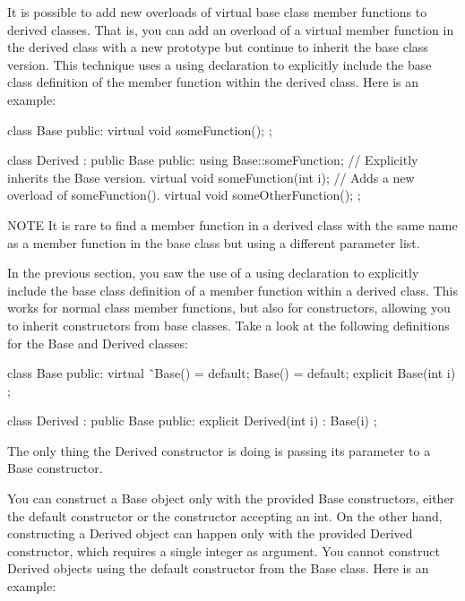 
It is possible to add new overloads of virtual base class member functions to derived classes. That is, you can add an overload of a virtual member function in the derived class with a new prototype but continue to inherit the base class version. This technique uses a using declaration to explicitly include the base class definition of the member function within the derived class. Here is an example:

\begin{cpp}
class Base
{
    public:
        virtual void someFunction();
};

class Derived : public Base
{
    public:
        using Base::someFunction; // Explicitly inherits the Base version.
        virtual void someFunction(int i); // Adds a new overload of someFunction().
        virtual void someOtherFunction();
};
\end{cpp}

\begin{myNotic}{NOTE}
It is rare to find a member function in a derived class with the same name as a member function in the base class but using a different parameter list.
\end{myNotic}


In the previous section, you saw the use of a using declaration to explicitly include the base class definition of a member function within a derived class. This works for normal class member functions, but also for constructors, allowing you to inherit constructors from base classes. Take a look at the following definitions for the Base and Derived classes:

\begin{cpp}
class Base
{
    public:
        virtual ˜Base() = default;
        Base() = default;
        explicit Base(int i) {}
};

class Derived : public Base
{
    public:
        explicit Derived(int i) : Base(i) {}
};
\end{cpp}

The only thing the Derived constructor is doing is passing its parameter to a Base constructor.

You can construct a Base object only with the provided Base constructors, either the default constructor or the constructor accepting an int. On the other hand, constructing a Derived object can happen only with the provided Derived constructor, which requires a single integer as argument. You cannot construct Derived objects using the default constructor from the Base class. Here is an example:

